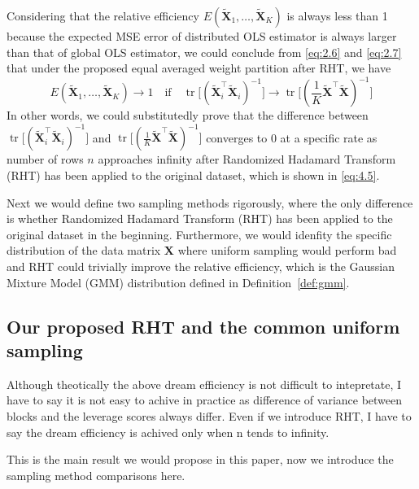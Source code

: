 \documentclass[11pt]{article}
\numberwithin{equation}{section}
\theoremstyle{plain}
\theoremstyle{definition}
\theoremstyle{remark}
\begin{document}
Considering that the relative efficiency \(E(\mathbf{\tilde{X}}_1,\ldots,\mathbf{\tilde{X}}_K)\) is always less than 1 because the expected MSE error of distributed OLS estimator is always larger than that of global OLS estimator, we could conclude from \ref{eq:2.6} and \ref{eq:2.7} that under the proposed equal averaged weight partition after RHT, we have
\[
E(\mathbf{\tilde{X}}_1,\ldots,\mathbf{\tilde{X}}_K) \to 1 \quad \text{if} \quad \operatorname{tr}\!\bigl[(\mathbf{\tilde{X}}_i^{\top}\mathbf{\tilde{X}}_i)^{-1}\bigr] \to \operatorname{tr}\!\bigl[(\frac{1}{K}\mathbf{\tilde{X}}^{\top}\mathbf{\tilde{X}})^{-1}\bigr]\tag{2.8} \label{eq:2.8}
\]
In other words, we could substitutedly prove that the difference between \(\operatorname{tr}\!\bigl[(\mathbf{\tilde{X}}_i^{\top}\mathbf{\tilde{X}}_i)^{-1}\bigr]\) and \(\operatorname{tr}\!\bigl[(\frac{1}{K}\mathbf{\tilde{X}}^{\top}\mathbf{\tilde{X}})^{-1}\bigr]\) converges to 0 at a specific rate as number of rows \(n\) approaches infinity after Randomized Hadamard Transform (RHT) has been applied to the original dataset, which is shown in \ref{eq:4.5}.

Next we would define two sampling methods rigorously, where the only difference is whether Randomized Hadamard Transform (RHT) has been applied to the original dataset in the beginning. Furthermore, we would idenfity the specific distribution of the data matrix $\mathbf{X}$ where uniform sampling would perform bad and RHT could trivially improve the relative efficiency, which is the Gaussian Mixture Model (GMM) distribution defined in Definition~\ref{def:gmm}.

\subsection{Our proposed RHT and the common uniform sampling}

Although theotically the above dream efficiency is not difficult to intepretate, I have to say it is not easy to achive in practice as difference of variance between blocks and the leverage scores always differ.
Even if we introduce RHT, I have to say the dream efficiency is achived only when n tends to infinity.

This is the main result we would propose in this paper, now we introduce the sampling method comparisons here.
\end{document}
